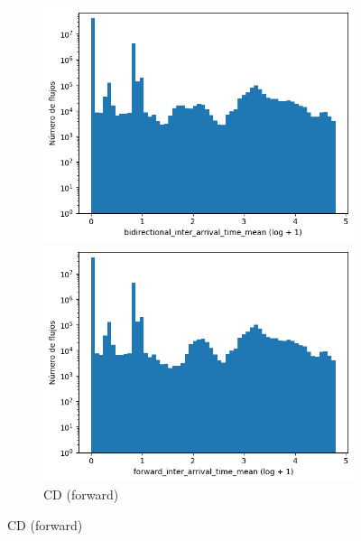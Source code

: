 \begin{figure}[H]
    \centering
    \hfill
    \begin{subfigure}[b]{0.32\textwidth}
        \centering
        \includegraphics[width=\textwidth]{media/packet_pincer_cicddos/bidirectional_inter_arrival_time_mean_log_x_log_y.png}
        \caption{CD (bidir.)}
        \includegraphics[width=\textwidth]{media/packet_pincer_cicddos/forward_inter_arrival_time_mean_log_x_log_y.png}
        \caption{CD (forward)}

\end{subfigure}
\end{figure}
